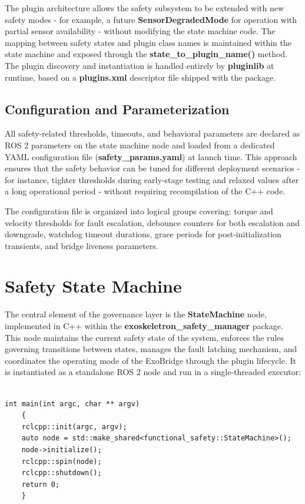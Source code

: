The plugin architecture allows the safety subsystem to be extended with new safety modes - for example, a future \textbf{SensorDegradedMode} for operation with partial sensor availability - without modifying the state machine code. The mapping between safety states and plugin class names is maintained within the state machine and exposed through the \textbf{state\_to\_plugin\_name()} method. The plugin discovery and instantiation is handled entirely by \textbf{pluginlib} at runtime, based on a \textbf{plugins.xml} descriptor file shipped with the package.

\subsection{Configuration and Parameterization}
All safety-related thresholds, timeouts, and behavioral parameters are declared as ROS 2 parameters on the state machine node and loaded from a dedicated YAML configuration file (\textbf{safety\_params.yaml}) at launch time. This approach ensures that the safety behavior can be tuned for different deployment scenarios - for instance, tighter thresholds during early-stage testing and relaxed values after a long operational period - without requiring recompilation of the C++ code.

The configuration file is organized into logical groups covering: torque and velocity thresholds for fault escalation, debounce counters for both escalation and downgrade, watchdog timeout durations, grace periods for post-initialization transients, and bridge liveness parameters.



\section{Safety State Machine}
The central element of the governance layer is the \textbf{StateMachine} node, implemented in C++ within the \textbf{exoskeletron\_safety\_manager} package. This node maintains the current safety state of the system, enforces the rules governing transitions between states, manages the fault latching mechanism, and coordinates the operating mode of the ExoBridge through the plugin lifecycle. It is instantiated as a standalone ROS 2 node and run in a single-threaded executor:

\begin{verbatim}

int main(int argc, char ** argv)
    {
    rclcpp::init(argc, argv);
    auto node = std::make_shared<functional_safety::StateMachine>();
    node->initialize();
    rclcpp::spin(node);
    rclcpp::shutdown();
    return 0;
    }

\end{verbatim}

